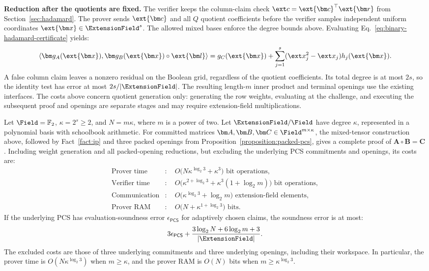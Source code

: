 \smallskip\noindent\textbf{Reduction after the quotients are fixed.}
The verifier keeps the column-claim check
\(\ext c=\ext{\bm c}^{\top}\ext{\bm r}\) from
Section~\ref{sec:hadamard}.
The prover sends \(\ext{\bm c}\) and all \(Q\) quotient
coefficients before the verifier samples independent uniform
coordinates \(\ext{\bm x}\in\ExtensionField^s\).
The allowed mixed bases enforce the degree bounds above.
Evaluating Eq.~\eqref{eq:binary-hadamard-certificate} yields:
\[
    \left\langle\bm g_A(\ext{\bm x}),
      \bm g_B(\ext{\bm x})\circ\ext{\bm l}\right\rangle
      =g_C(\ext{\bm x})+
       \sum_{j=1}^s(\ext x_j^2-\ext x_j)h_j(\ext{\bm x}).
\]
A false column claim leaves a nonzero residual on the Boolean
grid, regardless of the quotient coefficients. Its total degree
is at most \(2s\), so the identity test has error at most
\(2s/|\ExtensionField|\).
The resulting length-\(m\) inner product and terminal openings
use the existing interfaces. The costs above concern quotient
generation only: generating the row weights, evaluating at the
challenge, and executing the subsequent proof and openings are
separate stages and may require extension-field multiplications.

\begin{proposition}
\label{proposition:binary-hadamard-complexity}
Let \(\Field=\mathbb F_2\), \(\kappa=2^s\geq2\), and
\(N=m\kappa\), where \(m\) is a power of two.
Let \(\ExtensionField/\Field\) have degree \(\kappa\), represented
in a polynomial basis with schoolbook arithmetic.
For committed matrices
\(\bm A,\bm B,\bm C\in\Field^{m\times\kappa}\), the mixed-tensor
construction above, followed by Fact~\ref{fact:ip} and three
packed openings from Proposition~\ref{proposition:packed-pcs},
gives a complete proof of \(\bm A\circ\bm B=\bm C\).
Including weight generation and all packed-opening reductions,
but excluding the underlying PCS commitments and openings, its
costs are:
\[
\begin{aligned}
    \text{Prover time}
      &:\quad O\bigl(N\kappa^{\log_2 3}+\kappa^3\bigr)
          \text{ bit operations},\\
    \text{Verifier time}
      &:\quad O\bigl(\kappa^{2+\log_2 3}
              +\kappa^3(1+\log_2m)\bigr)
          \text{ bit operations},\\
    \text{Communication}
      &:\quad O\bigl(\kappa^{\log_2 3}+\log_2m\bigr)
          \text{ extension-field elements},\\
    \text{Prover RAM}
      &:\quad O\bigl(N+\kappa^{1+\log_2 3}\bigr)
          \text{ bits}.
\end{aligned}
\]
If the underlying PCS has evaluation-soundness error
\(\epsilon_{\mathsf{PCS}}\) for adaptively chosen claims, the
soundness error is at most:
\[
    3\epsilon_{\mathsf{PCS}}
    +\frac{3\log_2N+6\log_2m+3}{|\ExtensionField|}.
\]
The excluded costs are those of three underlying commitments and
three underlying openings, including their workspace.
In particular, the prover time is
\(O(N\kappa^{\log_2 3})\) when \(m\geq\kappa\), and the
prover RAM is \(O(N)\) bits when \(m\geq\kappa^{\log_2 3}\).
\end{proposition}

